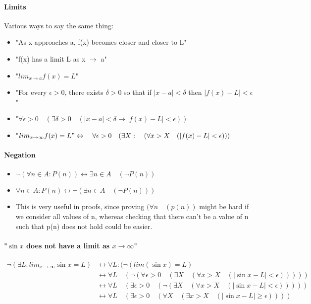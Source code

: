 \documentclass[9pt, letterpaper, oneside]{article}
\newcommand*\dbl{\leftrightarrow}
\begin{document}
\paragraph{Limits}
Various ways to say the same thing:
\begin{itemize}
\item "As x approaches a, f(x) becomes closer and closer to L"
\item "f(x) has a limit L as x $\to$ a" 
\item "$lim_{x \to a} f(x) = L$"
\item "For every $\epsilon > 0$, there exists $\delta > 0$ so that if $| x - a | < \delta$ then $|f(x) - L |< \epsilon$"
\item "$\forall \epsilon > 0 \quad (\exists \delta > 0 \quad (|x-a|<\delta \to |f(x) - L | < \epsilon))$
\item "$lim_{x \to \infty} f(x) = L" \dbl \quad \forall \epsilon > 0 \quad (\exists X : \quad (\forall x > X \quad (|f(x) - L| < \epsilon)))$
\end{itemize}

\paragraph{Negation}
\begin{itemize}
\item
$\neg(\forall n \in A : P(n)) \dbl \exists n \in A \quad (\neg P(n))$
\item
$\forall n \in A : P(n) \dbl \neg(\exists n \in A \quad (\neg P(n)))$
\item
This is very useful in proofs, since proving $(\forall n \quad (p(n))$ might be hard if we consider all
values of n, whereas checking that there can't be a value of n such that p(n) does
not hold could be easier.
\end{itemize}
\paragraph{"$\sin x$ does not have a limit as $x \to \infty$"}
\begin{align*}
\neg(\exists L : lim_{x \to \infty} \sin x = L)
&\dbl \forall L : (\neg (lim(\sin x) = L)\\
&\dbl \forall L \quad (\neg(\forall \epsilon > 0 \quad (\exists X \quad (\forall x > X \quad (|\sin x - L| <\epsilon)))))\\
&\dbl \forall L \quad (\exists \epsilon > 0 \quad (\neg (\exists X  \quad (\forall x > X \quad (|\sin x - L| <\epsilon)))))\\
&\dbl \forall L \quad (\exists \epsilon > 0 \quad (\forall X \quad (\exists x > X \quad (|\sin{x} -L | \geq \epsilon))))\\
\end{align*}
\end{document}
